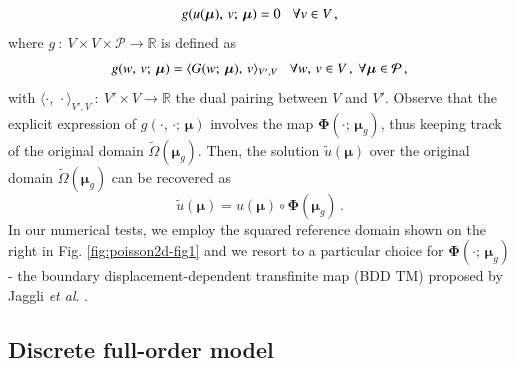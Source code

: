 \documentclass[longtitle]{elsarticle}
\numberwithin{equation}{section}
\theoremstyle{theorem}
\theoremstyle{definition}
\theoremstyle{remark}
\theoremstyle{proposition}
\numberwithin{figure}{section}
\newcommand{\wt}[1]{\widetilde{#1}}
\newcommand{\bg}[1]{\boldsymbol{#1}}
\begin{document}
		\begin{equation}
			\label{eq:pde-weak-reference}
			g(u(\bg{\mu}), \, v; \, \bg{\mu}) = 0 \hspace*{0.3cm} \forall v \in V \, ,
		\end{equation}
		where $g ~ : ~ V \times V \times \mathcal{P} \rightarrow \mathbb{R}$ is defined as
		\begin{equation*}
			g(w, \, v; \, \bg{\mu}) = \langle G(w; \, \bg{\mu}), \, v \rangle_{V',V} \hspace*{0.3cm} \forall w, \, v \in V \, , ~ \forall \bg{\mu} \in \mathcal{P} \, ,
		\end{equation*}
		with $\langle \cdot, \, \cdot \rangle_{V',V} ~ : ~ V' \times V \rightarrow \mathbb{R}$ the dual pairing between $V$ and $V'$. Observe that the explicit expression of $g(\cdot, \, \cdot; \, \bg{\mu})$ involves the map $\bg{\Phi}(\cdot; \, \bg{\mu}_g)$, thus keeping track of the original domain $\wt{\Omega}(\bg{\mu}_g)$. Then, the solution $\wt{u}(\bg{\mu})$ over the original domain $\wt{\Omega}(\bg{\mu}_g)$ can be recovered as
		\begin{equation*}
			\wt{u}(\bg{\mu}) = u(\bg{\mu}) \circ \bg{\Phi}(\bg{\mu}_g) \, .
		\end{equation*}
		In our numerical tests, we employ the squared reference domain shown on the right in Fig. \ref{fig:poisson2d-fig1} and we resort to a particular choice for $\bg{\Phi}(\cdot; \, \bg{\mu}_g)$ - the boundary displacement-dependent transfinite map (BDD TM) proposed by Jaggli \emph{et al}. \cite{JIR14}.
				
	
	\subsection{Discrete full-order model}
	\label{section:Discrete full-order model}
	
\end{document}
